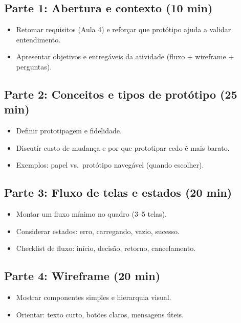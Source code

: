 \documentclass[12pt,a4paper]{article}
\begin{document}
\subsection*{Parte 1: Abertura e contexto (10 min)}
\begin{itemize}[leftmargin=*,itemsep=0.35em]
  \item Retomar requisitos (Aula 4) e reforçar que protótipo ajuda a validar entendimento.
  \item Apresentar objetivos e entregáveis da atividade (fluxo + wireframe + perguntas).
\end{itemize}

\subsection*{Parte 2: Conceitos e tipos de protótipo (25 min)}
\begin{itemize}[leftmargin=*,itemsep=0.35em]
  \item Definir prototipagem e fidelidade.
  \item Discutir custo de mudança e por que prototipar cedo é mais barato.
  \item Exemplos: papel vs.\ protótipo navegável (quando escolher).
\end{itemize}

\subsection*{Parte 3: Fluxo de telas e estados (20 min)}
\begin{itemize}[leftmargin=*,itemsep=0.35em]
  \item Montar um fluxo mínimo no quadro (3--5 telas).
  \item Considerar estados: erro, carregando, vazio, sucesso.
  \item Checklist de fluxo: início, decisão, retorno, cancelamento.
\end{itemize}

\subsection*{Parte 4: Wireframe (20 min)}
\begin{itemize}[leftmargin=*,itemsep=0.35em]
  \item Mostrar componentes simples e hierarquia visual.
  \item Orientar: texto curto, botões claros, mensagens úteis.
\end{itemize}
\end{document}
